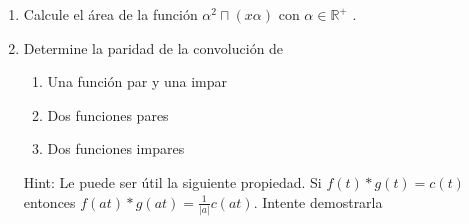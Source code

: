 \documentclass[letterpaper, 12pt]{article}
\newif\ifanswers
\begin{document}
\begin{enumerate}

     \item Calcule el área de la función $\alpha^2 \sqcap (x\alpha)$ con $\alpha \in \mathbb{R} ^+$ .
    \\
        \ifanswers
    {\color{red} 
    
    \textbf{Solución:}Es fácil ver que tenemos una función rectangular centrada en cero de ancho $1/\alpha$. De igual manera al tener altura $\alpha^2$ el área debe ser $1/\alpha \cdot \alpha^2 = \alpha$}

    \fi


    \item Determine la paridad de la convolución de 
    \begin{enumerate}
        \item Una función par y una impar
        \item Dos funciones pares
        \item Dos funciones impares
    \end{enumerate}
    Hint: Le puede ser útil la siguiente propiedad. Si $f(t)\ast g(t) = c(t)$ entonces $f(at)\ast g(at) = \frac{1}{|a|}c(at)$. Intente demostrarla
 \ifanswers
    {\color{red} 
    
    \textbf{Solución:}

    Por la hint con un escalamiento $a = -1$, se cumple en los tres casos que si $c(t) = f(t) \ast g(t)$ $c(-t) = \frac{1}{|-1|}f(-t) \ast g(-t) = f(-t) \ast g(-t)$

    \begin{enumerate}
        \item Sin pérdida de generalidad, suponga que $f$ es impar y $g$ par. En este caso $c(-t) = f(-t) \ast g(-t) = -f(t) \ast g(t) = -c(t)$. Por lo que $c(t)$ es impar
        \item Si ambas son pares $c(-t) = f(-t) \ast g(-t) = f(t) \ast g(t) = c(t)$, por lo que la convolución es par.
        \item Si ambas son impares $c(-t) = \frac{1}{|-1|}f(-t) \ast g(-t) = -f(t) \ast -g(t) = f(t) \ast g(t) = c(t)$, es decir, la convolución acá es par.
    \end{enumerate}
    
    }

    \fi

    
\end{enumerate}
\end{document}
